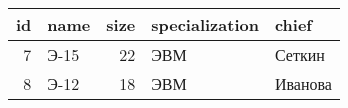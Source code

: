 \begin{tabular}{rlrll}
\toprule
id & name & size & specialization & chief \\
\midrule
7 & Э-15 & 22 & ЭВМ & Сеткин \\
8 & Э-12 & 18 & ЭВМ & Иванова \\
\bottomrule
\end{tabular}
